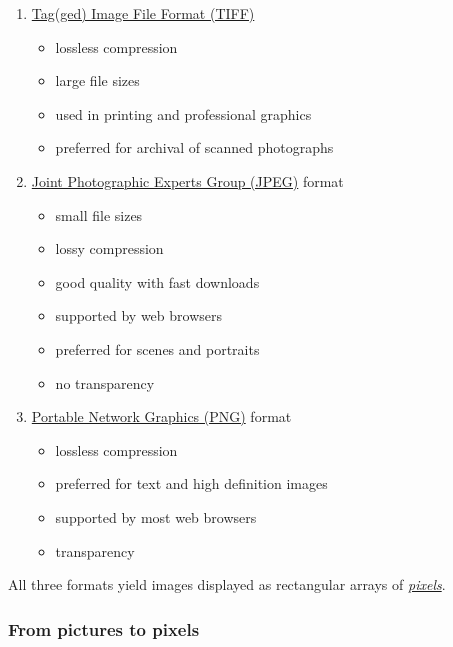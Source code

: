 \documentclass[
  12pt,
  british,
  a4paper,
  rgb,
  dvipsnames,
  svgnames,
  hyphens]{article}
\providecommand{\tightlist}{%
  \setlength{\itemsep}{0pt}\setlength{\parskip}{0pt}}
\begin{document}
\begin{enumerate}
\tightlist
\item
  \href{https://en.wikipedia.org/wiki/TIFF}{Tag(ged) Image File Format
  (TIFF)}

  \begin{itemize}
  \tightlist
  \item
    lossless compression
  \item
    large file sizes
  \item
    used in printing and professional graphics
  \item
    preferred for archival of scanned photographs
  \end{itemize}
\item
  \href{https://jpeg.org/about.html}{Joint Photographic Experts Group
  (JPEG)} format

  \begin{itemize}
  \tightlist
  \item
    small file sizes
  \item
    lossy compression
  \item
    good quality with fast downloads
  \item
    supported by web browsers
  \item
    preferred for scenes and portraits
  \item
    no transparency
  \end{itemize}
\item
  \href{http://www.libpng.org/pub/png/}{Portable Network Graphics (PNG)}
  format

  \begin{itemize}
  \tightlist
  \item
    lossless compression
  \item
    preferred for text and high definition images
  \item
    supported by most web browsers
  \item
    transparency
  \end{itemize}
\end{enumerate}

All three formats yield images displayed as rectangular arrays of
\href{https://en.wikipedia.org/wiki/Pixels}{\emph{pixels}}.

\hypertarget{from-pictures-to-pixels}{%
\subsubsection{From pictures to pixels}\label{from-pictures-to-pixels}}
\end{document}
